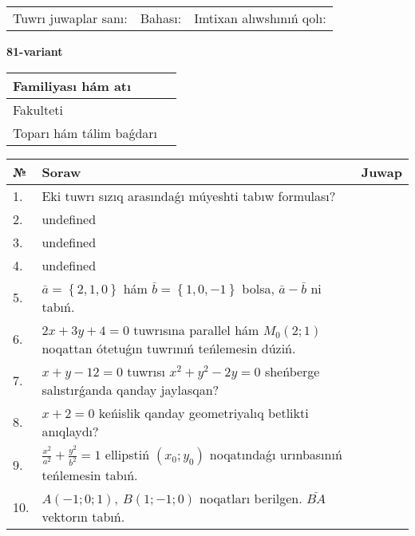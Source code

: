 \documentclass{article}
\begin{document}
\vspace{0.7cm}

\begin{tabular}{lll}
Tuwrı juwaplar sanı: \underline{\hspace{1cm}} & 
Bahası: \underline{\hspace{1cm}} & 
Imtixan alıwshınıń qolı: \underline{\hspace{2cm}} \\
\end{tabular}

\egroup

\newpage


\textbf{81-variant}\\

\bgroup
\def\arraystretch{1.6} %

\begin{tabular}{|m{5.7cm}|m{9.5cm}|}
\hline
Familiyası hám atı & \\
\hline
Fakulteti  & \\
\hline
Toparı hám tálim baǵdarı  & \\
\hline
\end{tabular}

\vspace{0.7cm}

\begin{tabular}{|m{0.7cm}|m{10cm}|m{4cm}|}
\hline
№ & Soraw & Juwap \\
\hline
1. & Eki tuwrı sızıq arasındaǵı múyeshti tabıw formulası? &  \\
\hline
2. & undefined &  \\
\hline
3. & undefined &  \\
\hline
4. & undefined &  \\
\hline
5. & \(\bar{a} = \left\{ 2, 1, 0 \right\}\) hám \(\bar{b} = \left\{ 1, 0,- 1 \right\}\) bolsa, \(\bar{a} - \bar{b}\) ni tabıń. &  \\
\hline
6. & \(2 x + 3 y + 4 = 0\) tuwrısına parallel hám \(M_{0} (2;1)\) noqattan ótetuǵın tuwrınıń teńlemesin dúziń. &  \\
\hline
7. & \(x + y - 12 = 0\) tuwrısı \(x^{2} + y^{2} - 2 y = 0\) sheńberge salıstırǵanda qanday jaylasqan? &  \\
\hline
8. & \(x + 2 = 0\) keńislik qanday geometriyalıq betlikti anıqlaydı? &  \\
\hline
9. & \(\frac{x^{2}}{a^{2}} + \frac{y^{2}}{b^{2}} = 1\) ellipstiń \((x_{0};y_{0})\) noqatındaǵı urınbasınıń teńlemesin tabıń. &  \\
\hline
10. & \(A (- 1;0;1),\ B (1; - 1;0)\) noqatları berilgen. \(\bar{BA}\) vektorın tabıń. & \\
\hline
\end{tabular}
\end{document}
